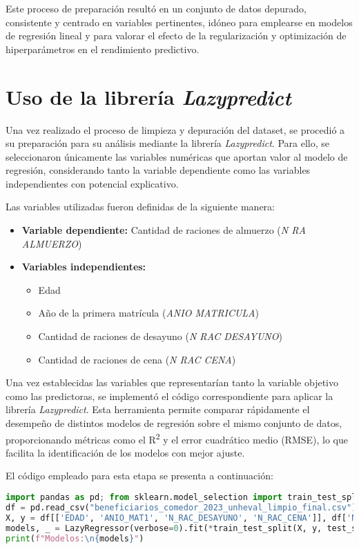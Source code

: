 \documentclass{article}
\begin{document}
Este proceso de preparación resultó en un conjunto de datos depurado, consistente y centrado en variables pertinentes, idóneo para emplearse en modelos de regresión lineal y para valorar el efecto de la regularización y optimización de hiperparámetros en el rendimiento predictivo.

\section{Uso de la librería \textit{Lazypredict}}

Una vez realizado el proceso de limpieza y depuración del dataset, se procedió a su preparación para su análisis mediante la librería \textit{Lazypredict}. Para ello, se seleccionaron únicamente las variables numéricas que aportan valor al modelo de regresión, considerando tanto la variable dependiente como las variables independientes con potencial explicativo.

Las variables utilizadas fueron definidas de la siguiente manera:

\begin{itemize}
    \item \textbf{Variable dependiente:} Cantidad de raciones de almuerzo (\textit{N RA ALMUERZO})
    \item \textbf{Variables independientes:}
    \begin{itemize}
        \item Edad
        \item Año de la primera matrícula (\textit{ANIO MATRICULA})
        \item Cantidad de raciones de desayuno (\textit{N RAC DESAYUNO})
        \item Cantidad de raciones de cena (\textit{N RAC CENA})
    \end{itemize}
\end{itemize}

Una vez establecidas las variables que representarían tanto la variable objetivo como las predictoras, se implementó el código correspondiente para aplicar la librería \textit{Lazypredict}. Esta herramienta permite comparar rápidamente el desempeño de distintos modelos de regresión sobre el mismo conjunto de datos, proporcionando métricas como el R\textsuperscript{2} y el error cuadrático medio (RMSE), lo que facilita la identificación de los modelos con mejor ajuste.

El código empleado para esta etapa se presenta a continuación:


\begin{lstlisting}[language=Python, caption={Uso de la libreria Lazypredict}]
import pandas as pd; from sklearn.model_selection import train_test_split; from lazypredict.Supervised import LazyRegressor
df = pd.read_csv("beneficiarios_comedor_2023_unheval_limpio_final.csv")[lambda x: x['N_RAC_ALMUERZO'] > 0]
X, y = df[['EDAD', 'ANIO_MAT1', 'N_RAC_DESAYUNO', 'N_RAC_CENA']], df['N_RAC_ALMUERZO']
models, _ = LazyRegressor(verbose=0).fit(*train_test_split(X, y, test_size=0.2, random_state=42))
print(f"Modelos:\n{models}")
\end{lstlisting}
\end{document}
